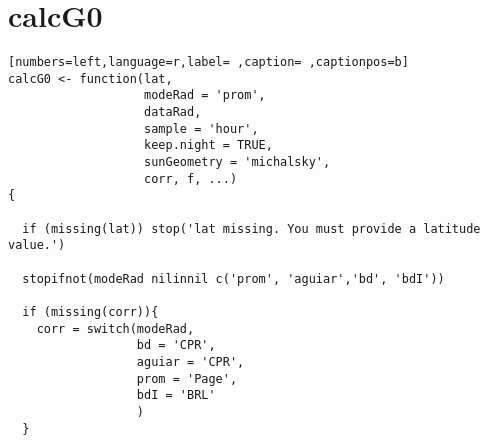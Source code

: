 \section{calcG0}
\label{sec:orgc080919}
\begin{lstlisting}[numbers=left,language=r,label= ,caption= ,captionpos=b]
calcG0 <- function(lat,
                   modeRad = 'prom',
                   dataRad,
                   sample = 'hour',
                   keep.night = TRUE,
                   sunGeometry = 'michalsky',
                   corr, f, ...)
{

  if (missing(lat)) stop('lat missing. You must provide a latitude value.')

  stopifnot(modeRad nilinnil c('prom', 'aguiar','bd', 'bdI'))

  if (missing(corr)){
    corr = switch(modeRad,
                  bd = 'CPR', 
                  aguiar = 'CPR', 
                  prom = 'Page',  
                  bdI = 'BRL'     
                  )
  }


\end{lstlisting}
